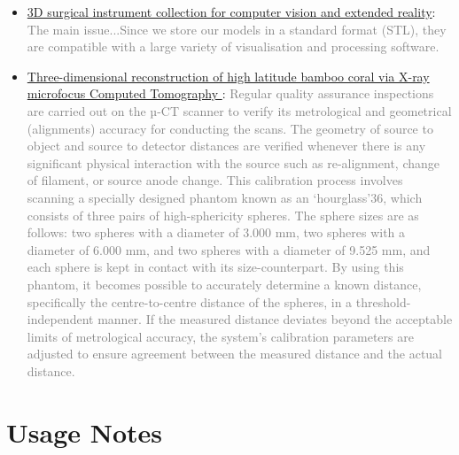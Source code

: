 \documentclass[fleqn,10pt]{wlscirep}
\begin{document}
\begin{itemize}
\begin{itemize}
\begin{itemize}
      \item
      \href{https://www.nature.com/articles/s41597-023-02684-0?_gl=1*1t69zgo*_up*MQ..&gclid=EAIaIQobChMInOXO84DVhgMViewWBR3vWQJAEAAYASAAEgJICfD_BwE#Sec12}{3D surgical instrument collection for computer vision and extended reality}: \textcolor{gray}{The main issue...Since we store our models in a standard format (STL), they are compatible with a large variety of visualisation and processing software.}
      
      \item
      \href{https://www.nature.com/articles/s41597-024-03396-9?_gl=1*1ikco52*_up*MQ..&gclid=EAIaIQobChMInOXO84DVhgMViewWBR3vWQJAEAAYASAAEgJICfD_BwE#Sec4}{Three-dimensional reconstruction of high latitude bamboo coral via X-ray microfocus Computed Tomography
}: \textcolor{gray}{Regular quality assurance inspections are carried out on the µ-CT scanner to verify its metrological and geometrical (alignments) accuracy for conducting the scans. The geometry of source to object and source to detector distances are verified whenever there is any significant physical interaction with the source such as re-alignment, change of filament, or source anode change. This calibration process involves scanning a specially designed phantom known as an ‘hourglass’36, which consists of three pairs of high-sphericity spheres. The sphere sizes are as follows: two spheres with a diameter of 3.000 mm, two spheres with a diameter of 6.000 mm, and two spheres with a diameter of 9.525 mm, and each sphere is kept in contact with its size-counterpart. By using this phantom, it becomes possible to accurately determine a known distance, specifically the centre-to-centre distance of the spheres, in a threshold-independent manner. If the measured distance deviates beyond the acceptable limits of metrological accuracy, the system’s calibration parameters are adjusted to ensure agreement between the measured distance and the actual distance.}
      
      \end{itemize}
      
    \end{itemize}
  
\end{itemize}
\fi

\section*{Usage Notes}\label{sec-usage-notes}
\end{document}
